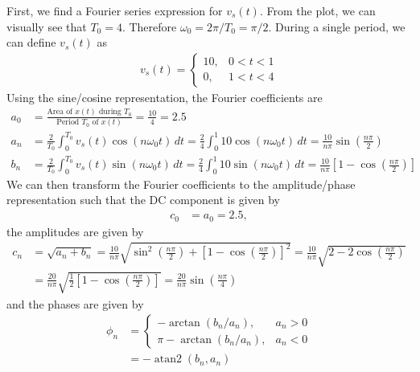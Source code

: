 \documentclass{report}
\begin{document}
\begin{solution}
    First, we find a Fourier series expression for $v_s(t)$. From the plot, we can visually see that $T_0=4$. Therefore $\omega_0 = 2\pi/T_0 = \pi/2$. During 
    a single period, we can define $v_s(t)$ as
    \begin{align*}
        v_s(t) = 
        \begin{cases}
            10, & 0<t<1 \\
            0, & 1<t<4
        \end{cases}
    \end{align*} 
    Using the sine/cosine representation, the Fourier coefficients are 
    \begin{align*}
        a_0 &= \frac{\text{Area of } x(t) \text{ during } T_0}{\text{Period } T_0 \text{ of } x(t)} = \frac{10}{4} = 2.5 \\
        a_n &= \frac{2}{T_0} \int_{0}^{T_0} v_s(t)\cos(n\omega_0 t) \,dt = \frac{2}{4} \int_{0}^{1} 10\cos(n\omega_0 t) \,dt = \frac{10}{n\pi}\sin\left(\frac{n\pi}{2}\right) \\
        b_n &= \frac{2}{T_0} \int_{0}^{T_0} v_s(t)\sin(n\omega_0 t) \,dt = \frac{2}{4} \int_{0}^{1} 10\sin(n\omega_0 t) \,dt = \frac{10}{n\pi}\left[1-\cos\left(\frac{n\pi}{2}\right)\right]
    \end{align*}
    We can then transform the Fourier coefficients to the amplitude/phase representation such that the DC component is given by 
    \begin{align*}
        c_0 &= a_0 = 2.5,
    \end{align*}
    the amplitudes are given by 
    \begin{align*}
        c_n &= \sqrt{a_n + b_n} = \frac{10}{n\pi}\sqrt{\sin^2\left(\frac{n\pi}{2}\right) + \left[1-\cos\left(\frac{n\pi}{2}\right)\right]^2} = \frac{10}{n\pi}\sqrt{2-2\cos\left(\frac{n\pi}{2}\right)} \\
        &= \frac{20}{n\pi}\sqrt{\frac{1}{2}\left[1-\cos\left(\frac{n\pi}{2}\right)\right]} = \frac{20}{n\pi}\sin\left(\frac{n\pi}{4}\right)
    \end{align*}
    and the phases are given by
    \begin{align*}
        \phi_n &= 
        \begin{cases} 
            -\arctan(b_n/a_n), & a_n>0 \\
            \pi-\arctan(b_n/a_n), & a_n<0
        \end{cases} \\
        &= -\operatorname{atan2}(b_n, a_n) \\

\end{align*}
\end{solution}
\end{document}
